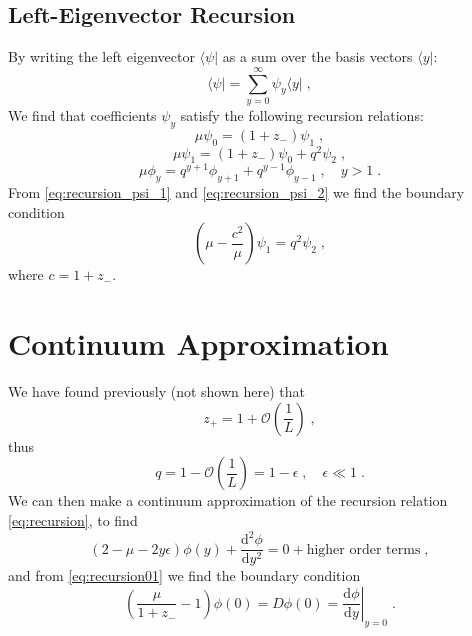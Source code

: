 \documentclass[a4paper,10pt]{article}
\newcommand{\D}{\mathrm{d}}
\newcommand{\Or}{\mathcal{O}}
\newcommand{\OL}{\Or\left(\frac{1}{L}\right)}
\newcommand{\bra}[1]{\langle #1 \vert}
\begin{document}
\subsection{Left-Eigenvector Recursion}


By writing the left eigenvector $\bra{\psi}$ as a sum over the basis vectors $\bra{y}$:
\begin{equation}\label{eq:psi_basis}
  \bra{\psi} = \sum_{y=0}^\infty \psi_y \bra{y} \;,
\end{equation}
We find that  coefficients $\psi_y$ satisfy the following recursion relations:
\begin{equation}\label{eq:recursion_psi_1}
  \mu \psi_0 = (1+z_-)\psi_1 \;,
\end{equation}
\begin{equation}\label{eq:recursion_psi_2}
  \mu \psi_1 = (1+z_-)\psi_0 + q^2\psi_2 \;,
\end{equation}
\begin{equation}\label{eq:recursion_psi_3}
   \mu \phi_y = q^{y+1} \phi_{y+1} + q^{y-1} \phi_{y-1} \;, \quad y>1 \;.
\end{equation}
From \eqref{eq:recursion_psi_1} and \eqref{eq:recursion_psi_2} we find the boundary condition
\begin{equation}\label{eq:psi_bc}
  \left( \mu - \frac{c^2}{\mu} \right) \psi_1 = q^2 \psi_2 \;,
\end{equation}
where $c = 1 + z_-$.

\section{Continuum Approximation}

We have found previously (not shown here) that
\begin{equation}\label{eq:z+}
  z_+ = 1 + \OL \;,
\end{equation}
thus
\begin{equation}\label{eq:q}
  q = 1 - \OL = 1 - \epsilon \;, \quad \epsilon \ll 1 \;.
\end{equation}
We can then make a continuum approximation of the recursion relation \eqref{eq:recursion}, to find
\begin{equation}\label{eq:ctm}
  (2-\mu - 2y\epsilon) \phi(y) + \frac{\D^2 \phi}{\D y^2} = 0 + \mbox{higher order terms} \;, %
\end{equation}
and from \eqref{eq:recursion01} we find the boundary condition
\begin{equation}\label{eq:bc}
  \left( \frac{\mu}{1+z_-} -1 \right) \phi(0) = D\phi(0) = \left. \frac{\D \phi}{\D y} \right|_{y=0} \;.
\end{equation}
\end{document}
